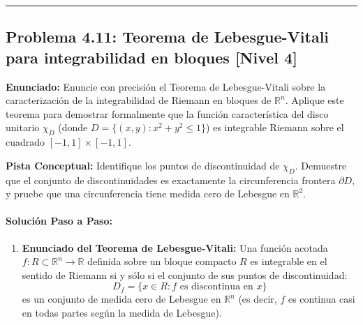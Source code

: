 \documentclass[11pt,a4paper]{article}
\begin{document}
\vspace{0.5cm}
\hrule
\vspace{0.5cm}

\subsection*{Problema 4.11: Teorema de Lebesgue-Vitali para integrabilidad en bloques \hfill \color{primaryblue}\small[Nivel 4]}

\begin{tcolorbox}[colback=white,colframe=gray!40,arc=1mm,boxrule=0.5pt,left=3mm,right=3mm,top=2mm,bottom=2mm]
\textbf{Enunciado:} Enuncie con precisión el Teorema de Lebesgue-Vitali sobre la caracterización de la integrabilidad de Riemann en bloques de $\mathbb{R}^n$. Aplique este teorema para demostrar formalmente que la función característica del disco unitario $\chi_{D}$ (donde $D = \{(x,y) : x^2 + y^2 \le 1\}$) es integrable Riemann sobre el cuadrado $[-1,1] \times [-1,1]$.
\end{tcolorbox}

\begin{tcolorbox}[colback=yellow!4,colframe=accentamber!70,arc=1mm,boxrule=0.5pt,left=3mm,right=3mm,top=1.5mm,bottom=1.5mm]
\textbf{Pista Conceptual:} Identifique los puntos de discontinuidad de $\chi_D$. Demuestre que el conjunto de discontinuidades es exactamente la circunferencia frontera $\partial D$, y pruebe que una circunferencia tiene medida cero de Lebesgue en $\mathbb{R}^2$.
\end{tcolorbox}

\paragraph{Solución Paso a Paso:}\par
\begin{enumerate}[label=\textbf{\arabic*.}]
\item \textbf{Enunciado del Teorema de Lebesgue-Vitali:}
Una función acotada $f: R \subset \mathbb{R}^n \to \mathbb{R}$ definida sobre un bloque compacto $R$ es integrable en el sentido de Riemann si y sólo si el conjunto de sus puntos de discontinuidad:
\begin{equation*}
D_f = \{x \in R : f \text{ es discontinua en } x\}
\end{equation*}
es un conjunto de medida cero de Lebesgue en $\mathbb{R}^n$ (es decir, $f$ es continua casi en todas partes según la medida de Lebesgue).
\end{enumerate}
\end{document}
